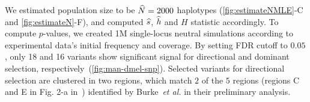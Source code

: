 We estimated population size to be $\widehat{N}=2000$ haplotypes 
(\ref{fig:estimateNMLE}-C and \ref{fig:estimateN}-F), and computed
$\widehat{s}$, $\widehat{h}$ and $H$ statistic accordingly. To compute $p$-values, we
created 1M single-locus neutral simulations according to experimental
data's initial frequency and coverage. By setting FDR cutoff to
$0.05$, only 18 and 16 variants show significant signal for
directional and dominant selection,
respectively~(\ref{fig:man-dmel-snp}).  Selected variants for
directional selection are clustered in two regions, which match $2$ of
the $5$ regions (regions C and E in Fig. 2-a
in~\cite{burke2014standing}) identified by Burke~\emph{et al.} in
their preliminary analysis.  
